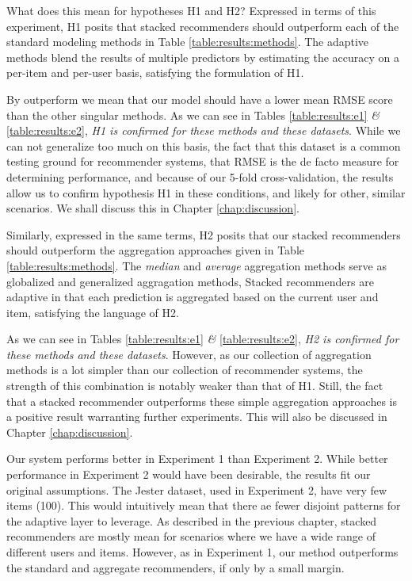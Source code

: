 What does this mean for hypotheses H1 and H2?
Expressed in terms of this experiment,
H1 posits that stacked recommenders should outperform each of the standard modeling methods
in Table \ref{table:results:methods}.
The adaptive methods blend the results of multiple predictors by estimating the accuracy
on a per-item and per-user basis, satisfying the formulation of H1.

By outperform we mean that our model should have a lower
mean RMSE score than the other singular methods. As we can see in Tables \ref{table:results:e1} \emph{\&} \ref{table:results:e2},
\emph{H1 is confirmed for these methods and these datasets}.
While we can not generalize too much on this basis, 
the fact that this dataset is a common testing ground for recommender systems,
that RMSE is the de facto measure for determining performance,
and because of our 5-fold cross-validation, the results allow us 
to confirm hypothesis H1 in these conditions, and likely for other, similar scenarios.
We shall discuss this in Chapter \ref{chap:discussion}.

Similarly, expressed in the same terms, H2 posits that 
our stacked recommenders should outperform the aggregation approaches
given in Table \ref{table:results:methods}.
The \emph{median} and \emph{average} aggregation methods
serve as globalized and generalized aggragation methods,
Stacked recommenders are adaptive in that each prediction is 
aggregated based on the current user and item,
satisfying the language of H2.

As we can see in Tables \ref{table:results:e1} \emph{\&} \ref{table:results:e2},
\emph{H2 is confirmed for these methods and these datasets}.
However, as our collection of aggregation methods is a lot simpler
than our collection of recommender systems, the strength of this combination
is notably weaker than that of H1.
Still, the fact that a stacked recommender outperforms these simple aggregation
approaches is a positive result warranting further experiments.
This will also be discussed in Chapter \ref{chap:discussion}.

Our system performs better in Experiment 1 than Experiment 2.
While better performance in Experiment 2 would have been desirable,
the results fit our original assumptions.
The Jester dataset, used in Experiment 2, have very few items (100).
This would intuitively mean that there ae fewer disjoint
patterns for the adaptive layer to leverage.
As described in the previous chapter, stacked recommenders
are mostly mean for scenarios where we have a wide range of
different users and items.
However, as in Experiment 1, our method outperforms the standard and aggregate recommenders,
if only by a small margin.

